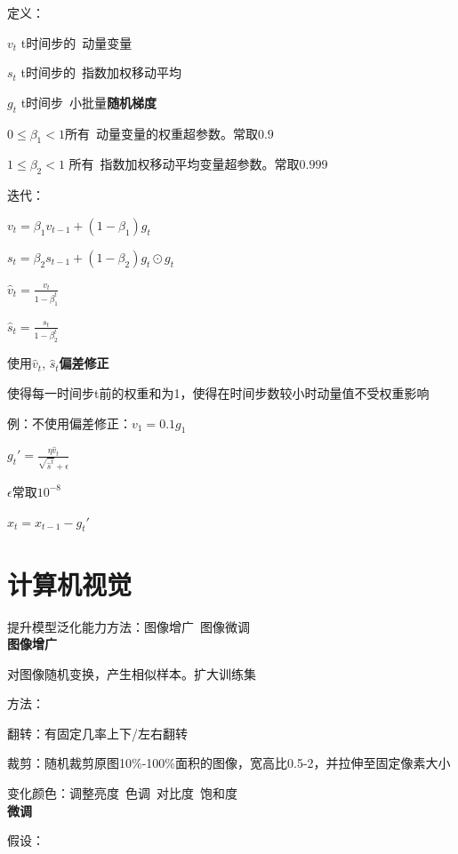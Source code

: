 \documentclass[UTF8]{ctexart}
\begin{document}
  定义：

  \quad $v_t$ t时间步的\ 动量变量

  \quad $s_t$ t时间步的\ 指数加权移动平均

  \quad $g_t$ t时间步\ 小批量\textbf{随机梯度}

  \quad $0\leq \beta_1<1$所有\ 动量变量的权重超参数。常取$0.9$
  
  \quad $1\leq \beta_2<1$ 所有\ 指数加权移动平均变量超参数。常取$0.999$

  迭代：

  \quad $v_t = \beta_1v_{t-1} + (1 -\beta_1)g_t$

  \quad $s_t = \beta_2 s_{t-1} + (1-\beta_2)g_t \odot g_t$

  \quad $\hat{v}_t = \frac{v_t}{1-\beta_1^t}$

  \quad $\hat{s}_t = \frac{s_t}{1-\beta_2^t}$

  \quad \quad 使用$\hat{v}_t$, $\hat{s}_t$\textbf{偏差修正}
  
  \quad \quad \quad 使得每一时间步t前的权重和为1，使得在时间步数较小时动量值不受权重影响

  \quad \quad \quad \quad 例：不使用偏差修正：$v_1 = 0.1g_1$

  \quad $g_t' = \frac{\eta \hat{v}_t}{\sqrt{\hat{s}^t} + \epsilon}$

  \quad \quad $\epsilon $常取$10^{-8}$

  \quad $x_t = x_{t-1} - g_t'$


\section{计算机视觉}
\noindent 提升模型泛化能力方法：图像增广\ 图像微调\\
\textbf{图像增广}

  对图像随机变换，产生相似样本。扩大训练集

  方法：

  \quad 翻转：有固定几率上下/左右翻转

  \quad 裁剪：随机裁剪原图10\%-100\%面积的图像，宽高比0.5-2，并拉伸至固定像素大小

  \quad 变化颜色：调整亮度\ 色调\ 对比度\ 饱和度\\
\textbf{微调}

  假设：
\end{document}
